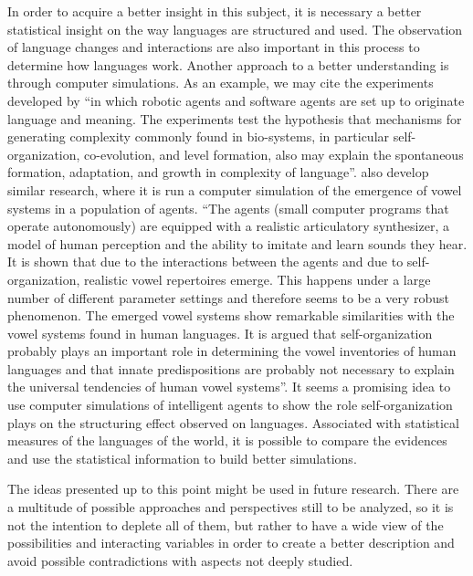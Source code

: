 In order to acquire a better insight in this subject, it is necessary a better statistical insight 
on the way languages are structured and used. 
The observation of language changes and interactions are also important in this process to determine 
how languages work. Another approach to a better understanding is through computer simulations. 
As an example, we may cite the experiments developed by \cite{steels97} ``in which robotic agents and 
software agents are set up to originate language and meaning. The experiments test the hypothesis that 
mechanisms for generating complexity commonly found in bio-systems, in particular self-organization, 
co-evolution, and level formation, also may explain the spontaneous formation, adaptation, and growth 
in complexity of language''. \cite{deboer01} also develop similar research, where it is run a computer 
simulation of the emergence of vowel systems in a population of agents. ``The agents (small computer 
programs that operate autonomously) are equipped with a realistic articulatory synthesizer, a model of 
human perception and the ability to imitate and learn sounds they hear. It is shown that due to the 
interactions between the agents and due to self-organization, realistic vowel repertoires emerge. 
This happens under a large number of different parameter settings and therefore seems to be a very robust 
phenomenon. The emerged vowel systems show remarkable similarities with the vowel systems found in human 
languages. It is argued that self-organization probably plays an important role in determining the vowel 
inventories of human languages and that innate predispositions are probably not necessary to explain the 
universal tendencies of human vowel systems''. It seems a promising idea to use computer simulations of 
intelligent agents to show the role self-organization plays on the structuring effect observed on languages. 
Associated with statistical measures of the languages of the world, it is possible to compare the evidences 
and use the statistical information to build better simulations.

The ideas presented up to this point might be used in future research. There are a multitude of possible 
approaches and perspectives still to be analyzed, so it is not the intention to deplete all of them, but 
rather to have a wide view of the possibilities and interacting variables in order to create a better description 
and avoid possible contradictions with aspects not deeply studied.

